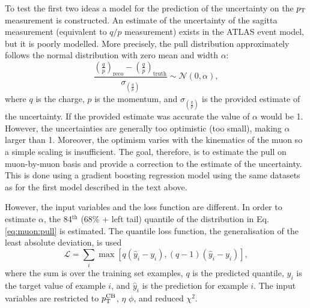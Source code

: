 To test the first two ideas a model for the prediction of the uncertainty
on the $p_{\text{T}}$ measurement is constructed. An estimate of the uncertainty
of the sagitta measurement (equivalent to $q/p$ measurement) exists in the
ATLAS event model, but it is poorly modelled. More precisely, the
pull distribution approximately follows the normal distribution with
zero mean and width $\alpha$:
\begin{equation}
\frac{\left(\frac{q}{p}\right)_\text{reco}
- \left(\frac{q}{p}\right)_\text{truth}}
{\sigma_{\left(\frac{q}{p}\right)}}
\sim \mathcal{N}(0, \alpha),
\label{eq:muon:pull}
\end{equation}
where $q$ is the charge, $p$ is the momentum, and
$\sigma_{\left(\frac{q}{p}\right)}$ is the provided estimate of the
uncertainty. If the provided estimate was accurate the value of $\alpha$
would be 1. However, the uncertainties are generally too optimistic (too
small), making $\alpha$ larger than 1. Moreover, the optimism varies with
the kinematics of the muon so a simple scaling is insufficient.
The goal, therefore, is to estimate
the pull on muon-by-muon basis and provide a correction to the estimate
of the uncertainty. This is done using a gradient boosting regression model
using the same datasets as for the first model described in the text above.

However, the input variables and the loss function are different. In order
to estimate $\alpha$, the 84$^\text{th}$ (68\% + left tail) quantile of the
distribution in Eq. \ref{eq:muon:pull} is estimated. The quantile loss
function, the generalisation of the least absolute deviation, is used \cite{qreg}
\begin{equation}
\mathcal{L} = \sum_{i}\max \left[ q (\hat{y}_i - y_i), (q-1)(\hat{y}_i - y_i)\right],
\end{equation}
where the sum is over the training set examples, $q$ is the predicted quantile,
$y_i$ is the target value of example $i$, and $\hat{y}_i$ is the prediction
for example $i$. The input variables are restricted to $p_{\text{T}}^\text{CB}$, $\eta$
$\phi$, and reduced $\chi^2$.

